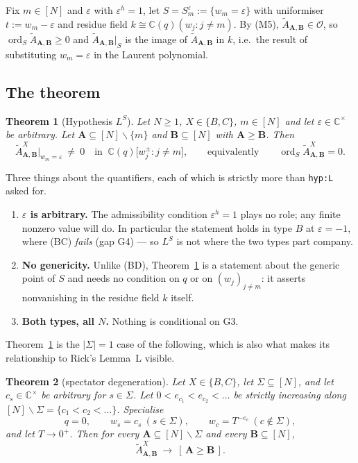 \documentclass[11pt]{article}
\theoremstyle{plain}
\newtheorem{thm}{Theorem}[section]
\theoremstyle{definition}
\newcommand{\At}{\widetilde{A}}
\newcommand{\bA}{\mathbf{A}}
\newcommand{\bB}{\mathbf{B}}
\newcommand{\sm}{\smallsetminus}
\newcommand{\ord}{\operatorname{ord}}
\begin{document}
Fix $m\in[N]$ and $\varepsilon$ with $\varepsilon^{h}=1$, let
$S=S_m^\varepsilon:=\{w_m=\varepsilon\}$ with uniformiser $t:=w_m-\varepsilon$
and residue field $k\cong\mathbb{C}(q)(w_j:j\ne m)$.  By (M5),
$\At_{\bA,\bB}\in\mathcal{O}$, so $\ord_S\At_{\bA,\bB}\ge0$ and
$\At_{\bA,\bB}|_{S}$ is the image of $\At_{\bA,\bB}$ in $k$, i.e.\ the result of
substituting $w_m=\varepsilon$ in the Laurent polynomial.

\subsection{The theorem}

\begin{thm}[Hypothesis $L^{S}$]\label{thm:LS}
Let $N\ge1$, $X\in\{B,C\}$, $m\in[N]$ and let $\varepsilon\in\mathbb{C}^{\times}$
be arbitrary.  Let $\bA\subseteq[N]\sm\{m\}$ and $\bB\subseteq[N]$ with
$\bA\ge\bB$.  Then
\[
  \At^{X}_{\bA,\bB}\big|_{w_m=\varepsilon}\ \ne\ 0
  \quad\text{in }\ \mathbb{C}(q)\bigl[w_j^{\pm}:j\ne m\bigr],
  \qquad\text{equivalently}\qquad
  \ord_S\At^{X}_{\bA,\bB}=0 .
\]
\end{thm}

Three things about the quantifiers, each of which is strictly more than
\texttt{hyp:L} asked for.
\begin{enumerate}[label=(\roman*),leftmargin=2.2em]
\item \textbf{$\varepsilon$ is arbitrary.}  The admissibility condition
  $\varepsilon^{h}=1$ plays no role; any finite nonzero value will do.  In
  particular the statement holds in type $B$ at $\varepsilon=-1$, where (BC)
  \emph{fails} (gap G4) --- so $L^{S}$ is not where the two types part company.
\item \textbf{No genericity.}  Unlike (BD), Theorem~\ref{thm:LS} is a statement
  about the generic point of $S$ and needs no condition on $q$ or on
  $(w_j)_{j\ne m}$: it asserts nonvanishing in the residue field $k$ itself.
\item \textbf{Both types, all $N$.}  Nothing is conditional on G3.
\end{enumerate}

Theorem~\ref{thm:LS} is the $|\Sigma|=1$ case of the following, which is also
what makes its relationship to Rick's Lemma~L visible.

\begin{thm}[spectator degeneration]\label{thm:spect}
Let $X\in\{B,C\}$, let $\Sigma\subseteq[N]$, and let $c_s\in\mathbb{C}^{\times}$
be arbitrary for $s\in\Sigma$.  Let $0<e_{c_1}<e_{c_2}<\dots$ be strictly
increasing along $[N]\sm\Sigma=\{c_1<c_2<\dots\}$.  Specialise
\[
  q=0,\qquad w_s=c_s\ (s\in\Sigma),\qquad w_c=T^{-e_c}\ (c\notin\Sigma),
\]
and let $T\to0^{+}$.  Then for every $\bA\subseteq[N]\sm\Sigma$ and every
$\bB\subseteq[N]$,
\[
  \At^{X}_{\bA,\bB}\ \longrightarrow\ [\,\bA\ge\bB\,].
\]
\end{thm}
\end{document}
